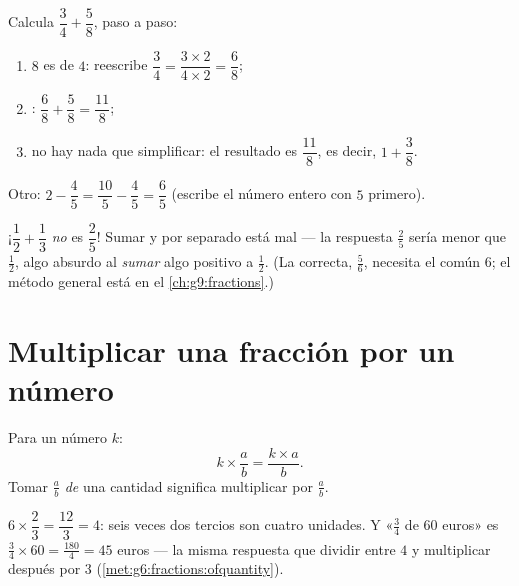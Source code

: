 \begin{example}\label{ex:g7:fractions:add}
Calcula $\dfrac{3}{4} + \dfrac{5}{8}$, paso a paso:
\begin{enumerate}
  \item $8$ es  de $4$: reescribe
        $\dfrac34 = \dfrac{3 \times 2}{4 \times 2} = \dfrac{6}{8}$;
  \item {}: $\dfrac{6}{8} + \dfrac{5}{8} = \dfrac{11}{8}$;
  \item no hay nada que simplificar: el resultado es $\dfrac{11}{8}$, es decir,
        $1 + \dfrac38$.
\end{enumerate}
Otro: $2 - \dfrac{4}{5} = \dfrac{10}{5} - \dfrac{4}{5} =
\dfrac{6}{5}$ (escribe el número entero con  $5$
primero).
\end{example}

\begin{example}\label{ex:g7:fractions:trap}
¡$\dfrac12 + \dfrac13$ \emph{no} es $\dfrac{2}{5}$! Sumar 
y  por separado está mal --- la respuesta $\frac25$ sería
menor que $\frac12$, algo absurdo al \emph{sumar} algo positivo
a $\frac12$. (La  correcta, $\frac56$, necesita el  común
$6$; el método general está en el \cref{ch:g9:fractions}.)
\end{example}

\section{Multiplicar una fracción por un número}

\begin{proposition}\label{prop:g7:fractions:mult}
Para un número $k$:
\[
k \times \frac{a}{b} = \frac{k \times a}{b} .
\]
Tomar $\frac ab$ \emph{de} una cantidad significa multiplicar por
$\frac ab$.
\end{proposition}
\admitted

\begin{example}\label{ex:g7:fractions:mult}
$6 \times \dfrac{2}{3} = \dfrac{12}{3} = 4$: seis veces dos tercios son
cuatro unidades. Y «$\frac34$ de $60$ euros» es
$\frac34 \times 60 = \frac{180}{4} = 45$ euros --- la misma respuesta que
dividir entre $4$ y multiplicar después por $3$
(\cref{met:g6:fractions:ofquantity}).
\end{example}

